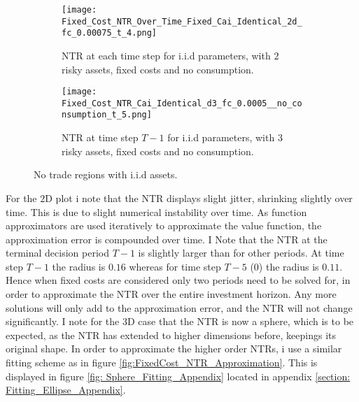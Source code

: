 \documentclass[11pt]{article}
\begin{document}
\begin{figure}[!ht]
    \centering
    \begin{subfigure}[t]{0.48\textwidth}
        \centering
        \texttt{[image: Fixed\_Cost\_NTR\_Over\_Time\_Fixed\_Cai\_Identical\_2d\_fc\_0.00075\_t\_4.png]}
        \caption{NTR at each time step for i.i.d parameters, with $2$ risky assets, fixed costs and no consumption.}
        \label{fig:Fixed_NTR_2d_iid_over_time}
    
    \end{subfigure}%
    \hfill
    \begin{subfigure}[t]{0.48\textwidth}
        \centering
        \texttt{[image: Fixed\_Cost\_NTR\_Cai\_Identical\_d3\_fc\_0.0005\_\_no\_consumption\_t\_5.png]}
        \caption{NTR at time step $T-1$ for i.i.d parameters, with $3$ risky assets, fixed costs and no consumption.}
        \label{fig:NTR_3d_iid_T-1}
    \end{subfigure}
    \caption{No trade regions with i.i.d assets.}
\end{figure}
For the $2$D plot i note that the NTR displays slight jitter, shrinking slightly over time. This is due to slight numerical instability over time. As function approximators
are used iteratively to approximate the value function, the approximation error is compounded over time.
I Note that the NTR at the terminal decision period $T-1$ is slightly larger than for other periods.
At time step $T-1$ the radius is $0.16$ whereas for time step $T-5$ ($0$) the radius is $0.11$.
Hence when fixed costs are considered only two periods need to be solved for, in order to approximate the NTR over the entire investment horizon.
Any more solutions will only add to the approximation error, and the NTR will not change significantly.
I note for the $3$D case that the NTR is now a sphere, which is to be expected, as the NTR has extended to higher dimensions before, keepings its original shape.
In order to approximate the higher order \ac{NTR}s, i use a similar fitting scheme as in figure \ref{fig:FixedCost_NTR_Approximation}.
This is displayed in figure \ref{fig: Sphere_Fitting_Appendix} located in appendix \ref{section: Fitting_Ellipse_Appendix}.
\end{document}
